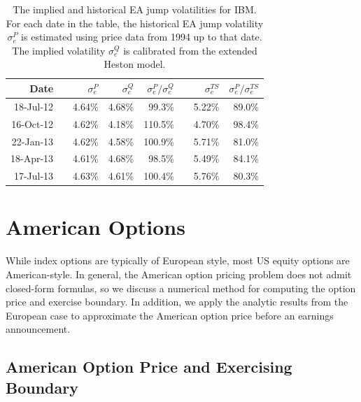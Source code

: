 \documentclass[11pt]{article}
\numberwithin{equation}{section}
\numberwithin{theorem}{section}
\begin{document}
 
\begin{table}[H]
  \centering
  \footnotesize
    \begin{tabular}{rrrrrrrr}
    \hline
    Date  &       &  $\sigma_e^P$ & $\sigma_e^Q$ & $\sigma_e^P/\sigma_e^Q$  &       & $\sigma_e^{TS}$ & $\sigma_e^P/\sigma_e^{TS}$ \\
\hline
    18-Jul-12 &       & 4.64\% & 4.68\% & 99.3\% &       & 5.22\% & 89.0\% \\
    16-Oct-12 &       & 4.62\% & 4.18\% & 110.5\% &       & 4.70\% & 98.4\% \\
    22-Jan-13 &       & 4.62\% & 4.58\% & 100.9\% &       & 5.71\% & 81.0\% \\
    18-Apr-13 &       & 4.61\% & 4.68\% & 98.5\% &       & 5.49\% & 84.1\% \\
    17-Jul-13 &       & 4.63\% & 4.61\% & 100.4\% &       & 5.76\% & 80.3\% \\
    \hline
    \end{tabular}%
  \caption{\small The implied and historical EA jump volatilities for IBM.  For each date in the table, the historical EA jump volatility $\sigma_e^P$ is estimated using price data from 1994 up to that date. The implied volatility $\sigma_e^Q$ is calibrated from the extended Heston model. }
  \label{tab:risk_premia}
\end{table}




\section{American Options\label{sec:american}}

While index options are typically of  European style, most
US equity options are  American-style. In general, the American option pricing
problem does not admit closed-form formulas,  so we discuss a    numerical method  for computing the option price and exercise boundary. In addition, we apply the  analytic results from the European case to approximate the American option price before an earnings announcement.  


\subsection{American Option Price and Exercising Boundary\label{sub:american}}
\end{document}
